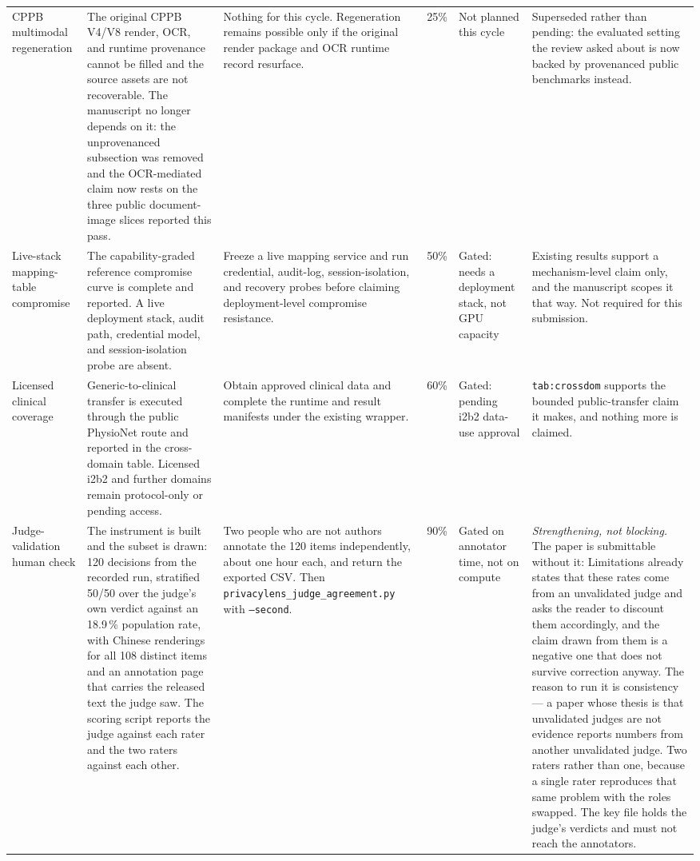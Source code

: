 \documentclass[11pt]{article}
\begin{document}
\begin{longtable}{p{}p{}p{}p{}p{}p{}}
CPPB multimodal regeneration & The original CPPB V4/V8 render, OCR, and runtime provenance cannot be filled and the source assets are not recoverable. The manuscript no longer depends on it: the unprovenanced subsection was removed and the OCR-mediated claim now rests on the three public document-image slices reported this pass. & Nothing for this cycle. Regeneration remains possible only if the original render package and OCR runtime record resurface. & 25\% & Not planned this cycle & Superseded rather than pending: the evaluated setting the review asked about is now backed by provenanced public benchmarks instead. \\
Live-stack mapping-table compromise & The capability-graded reference compromise curve is complete and reported. A live deployment stack, audit path, credential model, and session-isolation probe are absent. & Freeze a live mapping service and run credential, audit-log, session-isolation, and recovery probes before claiming deployment-level compromise resistance. & 50\% & Gated: needs a deployment stack, not GPU capacity & Existing results support a mechanism-level claim only, and the manuscript scopes it that way. Not required for this submission. \\
Licensed clinical coverage & Generic-to-clinical transfer is executed through the public PhysioNet route and reported in the cross-domain table. Licensed i2b2 and further domains remain protocol-only or pending access. & Obtain approved clinical data and complete the runtime and result manifests under the existing wrapper. & 60\% & Gated: pending i2b2 data-use approval & \texttt{tab:crossdom} supports the bounded public-transfer claim it makes, and nothing more is claimed. \\
Judge-validation human check & The instrument is built and the subset is drawn: 120 decisions from the recorded run, stratified 50/50 over the judge's own verdict against an 18.9\,\% population rate, with Chinese renderings for all 108 distinct items and an annotation page that carries the released text the judge saw. The scoring script reports the judge against each rater and the two raters against each other. & Two people who are not authors annotate the 120 items independently, about one hour each, and return the exported CSV. Then \texttt{privacylens\_judge\_agreement.py} with \texttt{--second}. & 90\% & Gated on annotator time, not on compute & \emph{Strengthening, not blocking.} The paper is submittable without it: Limitations already states that these rates come from an unvalidated judge and asks the reader to discount them accordingly, and the claim drawn from them is a negative one that does not survive correction anyway. The reason to run it is consistency --- a paper whose thesis is that unvalidated judges are not evidence reports numbers from another unvalidated judge. Two raters rather than one, because a single rater reproduces that same problem with the roles swapped. The key file holds the judge's verdicts and must not reach the annotators. \\

\end{longtable}
\end{document}
